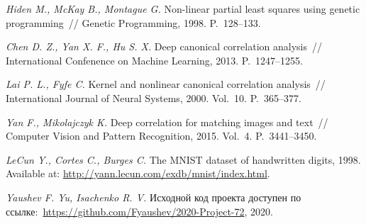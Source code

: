 \documentclass[12pt]{article}
\begin{document}
\begin{thebibliography}{99}
		\textit{Hiden M., McKay B., Montague G.} Non-linear partial least squares using genetic programming~// Genetic Programming, 1998. P.~128--133.
		
		\textit{Chen D. Z., Yan X. F., Hu S. X.} Deep canonical correlation analysis~// International Confenence on Machine Learning, 2013. P.~1247--1255.
		
		\textit{Lai P. L., Fyfe C.} Kernel and nonlinear canonical correlation analysis~// International Journal of Neural Systems, 2000. Vol.~10. P.~365--377.
		
		\textit{Yan F., Mikolajczyk K.} Deep correlation for matching images and text~// Computer Vision and Pattern Recognition, 2015. Vol.~4. P.~3441--3450.
		
		\textit{LeCun Y.,  Cortes C., Burges C.} The MNIST dataset of handwritten digits, 1998. Available at: \url{http://yann.lecun.com/exdb/mnist/index.html}.
		
		\textit{Yaushev F. Yu,  Isachenko R. V.} Исходной код проекта доступен по ссылке:~\url{https://github.com/Fyaushev/2020-Project-72}, 2020.
	\end{thebibliography}
	
\end{document}
